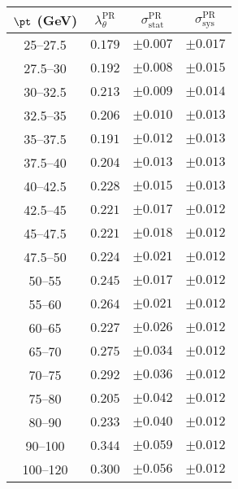 \begin{tabular}{c||c||c|c}
$\pt$ (GeV) & $\lambda_\theta^{\text{PR}}$ & $\sigma_{\text{stat}}^{\text{PR}}$ & $\sigma_{\text{sys}}^{\text{PR}}$  \\
\hline
25--27.5 & $0.179$ & $\pm0.007$ & $\pm0.017$\\
27.5--30 & $0.192$ & $\pm0.008$ & $\pm0.015$\\
30--32.5 & $0.213$ & $\pm0.009$ & $\pm0.014$\\
32.5--35 & $0.206$ & $\pm0.010$ & $\pm0.013$\\
35--37.5 & $0.191$ & $\pm0.012$ & $\pm0.013$\\
37.5--40 & $0.204$ & $\pm0.013$ & $\pm0.013$\\
40--42.5 & $0.228$ & $\pm0.015$ & $\pm0.013$\\
42.5--45 & $0.221$ & $\pm0.017$ & $\pm0.012$\\
45--47.5 & $0.221$ & $\pm0.018$ & $\pm0.012$\\
47.5--50 & $0.224$ & $\pm0.021$ & $\pm0.012$\\
50--55 & $0.245$ & $\pm0.017$ & $\pm0.012$\\
55--60 & $0.264$ & $\pm0.021$ & $\pm0.012$\\
60--65 & $0.227$ & $\pm0.026$ & $\pm0.012$\\
65--70 & $0.275$ & $\pm0.034$ & $\pm0.012$\\
70--75 & $0.292$ & $\pm0.036$ & $\pm0.012$\\
75--80 & $0.205$ & $\pm0.042$ & $\pm0.012$\\
80--90 & $0.233$ & $\pm0.040$ & $\pm0.012$\\
90--100 & $0.344$ & $\pm0.059$ & $\pm0.012$\\
100--120 & $0.300$ & $\pm0.056$ & $\pm0.012$
\end{tabular}

